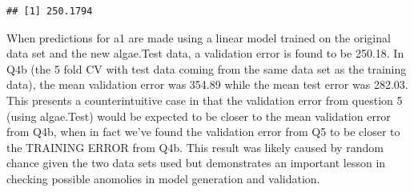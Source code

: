 \documentclass[]{article}
\newenvironment{Shaded}{\begin{snugshade}}{\end{snugshade}}
\newcommand{\KeywordTok}[1]{\textcolor[rgb]{0.13,0.29,0.53}{\textbf{#1}}}
\newcommand{\DataTypeTok}[1]{\textcolor[rgb]{0.13,0.29,0.53}{#1}}
\newcommand{\DecValTok}[1]{\textcolor[rgb]{0.00,0.00,0.81}{#1}}
\newcommand{\StringTok}[1]{\textcolor[rgb]{0.31,0.60,0.02}{#1}}
\newcommand{\CommentTok}[1]{\textcolor[rgb]{0.56,0.35,0.01}{\textit{#1}}}
\newcommand{\OperatorTok}[1]{\textcolor[rgb]{0.81,0.36,0.00}{\textbf{#1}}}
\newcommand{\NormalTok}[1]{#1}
\begin{document}
\begin{Shaded}
\end{Shaded}

\begin{verbatim}
## [1] 250.1794
\end{verbatim}

When predictions for a1 are made using a linear model trained on the
original data set and the new algae.Test data, a validation error is
found to be 250.18. In Q4b (the 5 fold CV with test data coming from the
same data set as the training data), the mean validation error was
354.89 while the mean test error was 282.03. This presents a
counterintuitive case in that the validation error from question 5
(using algae.Test) would be expected to be closer to the mean validation
error from Q4b, when in fact we've found the validation error from Q5 to
be closer to the TRAINING ERROR from Q4b. This result was likely caused
by random chance given the two data sets used but demonstrates an
important lesson in checking possible anomolies in model generation and
validation.
\end{document}
